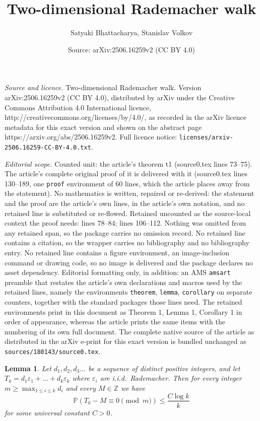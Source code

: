 \documentclass[10pt,a4paper]{amsart}
\title{Two-dimensional Rademacher walk}
\author{Satyaki Bhattacharya, Stanislav Volkov}
\date{Source: arXiv:2506.16259v2 (CC BY 4.0)}
\newtheorem{lemma}{Lemma}
\renewcommand\P{\mathbb{P}}
\newcommand\Z{\mathbb{Z}}
\newcommand\eps{\varepsilon}
\begin{document}
\maketitle

\noindent\emph{Source and licence.} Two-dimensional Rademacher walk. Version arXiv:2506.16259v2 (CC BY 4.0), distributed by arXiv under the Creative Commons Attribution 4.0 International licence, http://creativecommons.org/licenses/by/4.0/, as recorded in the arXiv licence metadata for this exact version and shown on the abstract page https://arxiv.org/abs/2506.16259v2. Full licence notice: \texttt{licenses/arxiv-2506.16259-CC-BY-4.0.txt}.\par\smallskip

\noindent\textit{Editorial scope.} Counted unit: the article's theorem t1 (source0.tex lines 73--75). The article's complete original proof of it is delivered with it (source0.tex lines 130--189, one \texttt{proof} environment of 60 lines, which the article places away from the statement). No mathematics is written, repaired or re-derived: the statement and the proof are the article's own lines, in the article's own notation, and no retained line is substituted or re-flowed.  Retained uncounted as the source-local context the proof needs: lines 78--84; lines 106--112.  Nothing was omitted from any retained span, so the package carries no omission record.  No retained line contains a citation, so the wrapper carries no bibliography and no bibliography entry.  No retained line contains a figure environment, an image-inclusion command or drawing code, so no image is delivered and the package declares no asset dependency.  Editorial formatting only, in addition: an AMS \texttt{amsart} preamble that restates the article's own declarations and macros used by the retained lines, namely the environments \texttt{theorem}, \texttt{lemma}, \texttt{corollary} on separate counters, together with the standard packages those lines need.  The retained environments print in this document as Theorem 1, Lemma 1, Corollary 1 in order of appearance, whereas the article prints the same items with the numbering of its own full document.  The complete native source of the article as distributed in the arXiv e-print for this exact version is bundled unchanged as \texttt{sources/180143/source0.tex}.
\begin{lemma}\label{modlemma}
Let $d_1,d_2,d_3\dots$ be a sequence of distinct positive integers, and let $T_k=d_1\eps_1+\dots+d_k\eps_k$ where  $\eps_i$ are i.i.d.\ Rademacher. Then for every integer $\displaystyle  m\ge \max_{1\le i\le k}d_i$ and every  $M\in\Z$ we have
$$
\P(T_k-M\equiv 0\pmod m)\le \frac{C \log k}{k}    
$$
for  some universal constant $C>0$.
\end{lemma}
\end{document}
